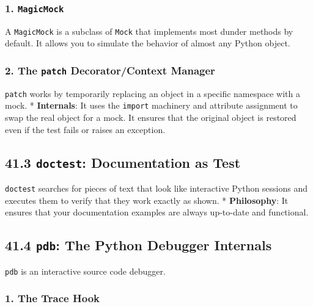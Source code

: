\hypertarget{magicmock}{%
\subsubsection{\texorpdfstring{1.
\texttt{MagicMock}}{1. MagicMock}}\label{magicmock}}

A \passthrough{\lstinline!MagicMock!} is a subclass of
\passthrough{\lstinline!Mock!} that implements most dunder methods by
default. It allows you to simulate the behavior of almost any Python
object.

\hypertarget{the-patch-decoratorcontext-manager}{%
\subsubsection{\texorpdfstring{2. The \texttt{patch} Decorator/Context
Manager}{2. The patch Decorator/Context Manager}}\label{the-patch-decoratorcontext-manager}}

\passthrough{\lstinline!patch!} works by temporarily replacing an object
in a specific namespace with a mock. * \textbf{Internals}: It uses the
\passthrough{\lstinline!import!} machinery and attribute assignment to
swap the real object for a mock. It ensures that the original object is
restored even if the test fails or raises an exception.

\hypertarget{doctest-documentation-as-test}{%
\subsection{\texorpdfstring{41.3 \texttt{doctest}: Documentation as
Test}{41.3 doctest: Documentation as Test}}\label{doctest-documentation-as-test}}

\passthrough{\lstinline!doctest!} searches for pieces of text that look
like interactive Python sessions and executes them to verify that they
work exactly as shown. * \textbf{Philosophy}: It ensures that your
documentation examples are always up-to-date and functional.

\hypertarget{pdb-the-python-debugger-internals}{%
\subsection{\texorpdfstring{41.4 \texttt{pdb}: The Python Debugger
Internals}{41.4 pdb: The Python Debugger Internals}}\label{pdb-the-python-debugger-internals}}

\passthrough{\lstinline!pdb!} is an interactive source code debugger.

\hypertarget{the-trace-hook}{%
\subsubsection{1. The Trace Hook}\label{the-trace-hook}}

